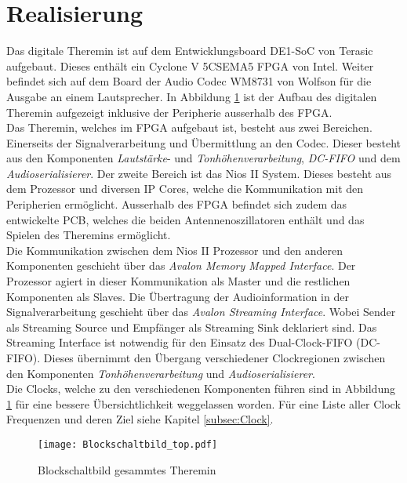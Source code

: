 

\clearpage
\section{Realisierung}\label{sec:Realisierung}

Das digitale Theremin ist auf dem Entwicklungsboard DE1-SoC von Terasic aufgebaut. Dieses enthält ein Cyclone V 5CSEMA5 FPGA von Intel. Weiter befindet sich auf dem Board der Audio Codec WM8731 von Wolfson für die Ausgabe an einem Lautsprecher. In Abbildung \ref{img:Blockschaltbild_top} ist der Aufbau des digitalen Theremin aufgezeigt inklusive der Peripherie ausserhalb des FPGA.\\
Das Theremin, welches im FPGA aufgebaut ist, besteht aus zwei Bereichen. Einerseits der Signalverarbeitung und Übermittlung an den Codec. Dieser besteht aus den Komponenten \textit{Lautstärke}- und \textit{Tonhöhenverarbeitung}, \textit{DC-FIFO} und dem \textit{Audioserialisierer}. Der zweite Bereich ist das Nios II System. Dieses besteht aus dem Prozessor und diversen IP Cores, welche die Kommunikation mit den Peripherien ermöglicht. Ausserhalb des FPGA befindet sich zudem das entwickelte PCB, welches die beiden Antennenoszillatoren enthält und das Spielen des Theremins ermöglicht.\\
Die Kommunikation zwischen dem Nios II Prozessor und den anderen Komponenten geschieht über das \textit{Avalon Memory Mapped Interface}. Der Prozessor agiert in dieser Kommunikation als Master und die restlichen Komponenten als Slaves. Die Übertragung der Audioinformation in der Signalverarbeitung geschieht über das \textit{Avalon Streaming Interface}. Wobei Sender als Streaming Source und Empfänger als Streaming Sink deklariert sind. Das Streaming Interface ist notwendig für den Einsatz des Dual-Clock-FIFO (DC-FIFO). Dieses übernimmt den Übergang verschiedener Clockregionen zwischen den Komponenten \textit{Tonhöhenverarbeitung} und \textit{Audioserialisierer}.\\
Die Clocks, welche zu den verschiedenen Komponenten führen sind in Abbildung \ref{img:Blockschaltbild_top} für eine bessere Übersichtlichkeit weggelassen worden. Für eine Liste aller Clock Frequenzen und deren Ziel siehe Kapitel \ref{subsec:Clock}.

\begin{figure}[h!]
	\centering
	\texttt{[image: Blockschaltbild\_top.pdf]}
	\caption{Blockschaltbild gesammtes Theremin} 
	\label{img:Blockschaltbild_top}
\end{figure}  

\clearpage

